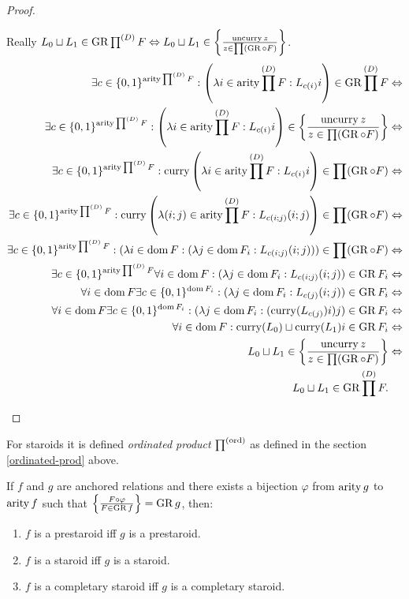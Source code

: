 \begin{proof}
\begin{widedisorder}
Really $L_{0}\sqcup L_{1}\in\operatorname{GR}\prod^{(D)}F\Leftrightarrow L_{0}\sqcup L_{1}\in\left\{ \frac{\operatorname{uncurry} z}{z\in\prod(\operatorname{GR}\circ F)}\right\}$.
\begin{align*}
\exists c\in\{0,1\}^{\operatorname{arity}\prod^{(D)}F}:\left(\lambda i\in\operatorname{arity}\prod^{(D)}F:L_{c(i_{})}i\right)\in\operatorname{GR}\prod^{(D)}F & \Leftrightarrow\\
\exists c\in\{0,1\}^{\operatorname{arity}\prod^{(D)}F}:\left(\lambda i\in\operatorname{arity}\prod^{(D)}F:L_{c(i_{})}i\right)\in\left\{ \frac{\operatorname{uncurry} z}{z\in\prod(\operatorname{GR}\circ F)}\right\} & \Leftrightarrow\\
\exists c\in\{0,1\}^{\operatorname{arity}\prod^{(D)}F}:\operatorname{curry}\left(\lambda i\in\operatorname{arity}\prod^{(D)}F:L_{c(i_{})}i\right)\in\prod(\operatorname{GR}\circ F) & \Leftrightarrow\\
\exists c\in\{0,1\}^{\operatorname{arity}\prod^{(D)}F}:\operatorname{curry}\left(\lambda(i;j)\in\operatorname{arity}\prod^{(D)}F:L_{c(i;j)}(i;j)\right)\in\prod(\operatorname{GR}\circ F) & \Leftrightarrow\\
\exists c\in\{0,1\}^{\operatorname{arity}\prod^{(D)}F}:(\lambda i\in\operatorname{dom} F:(\lambda j\in\operatorname{dom} F_{i}:L_{c(i;j)}(i;j)))\in\prod(\operatorname{GR}\circ F) & \Leftrightarrow\\
\exists c\in\{0,1\}^{\operatorname{arity}\prod^{(D)}F}\forall i\in\operatorname{dom} F:(\lambda j\in\operatorname{dom} F_{i}:L_{c(i;j)}(i;j))\in\operatorname{GR} F_{i} & \Leftrightarrow\\
\forall i\in\operatorname{dom} F\exists c\in\{0,1\}^{\operatorname{dom} F_{i}}:(\lambda j\in\operatorname{dom} F_{i}:L_{c(j)}(i;j))\in\operatorname{GR} F_{i} & \Leftrightarrow\\
\forall i\in\operatorname{dom} F\exists c\in\{0,1\}^{\operatorname{dom} F_{i}}:(\lambda j\in\operatorname{dom} F_{i}:(\operatorname{curry}(L_{c(j)})i)j)\in\operatorname{GR} F_{i} & \Leftrightarrow\\
\forall i\in\operatorname{dom} F:\operatorname{curry}(L_{0})\sqcup\operatorname{curry}(L_{1})i\in\operatorname{GR} F_{i} & \Leftrightarrow\\
L_{0}\sqcup L_{1}\in\left\{ \frac{\operatorname{uncurry} z}{z\in\prod(\operatorname{GR}\circ F)}\right\} & \Leftrightarrow\\
L_{0}\sqcup L_{1}\in\operatorname{GR}\prod^{(D)}F.
\end{align*}


\end{widedisorder}
\end{proof}
For staroids it is defined \emph{ordinated product} $\prod^{(\operatorname{ord})}$
as defined in the section \ref{ordinated-prod} above.
\begin{obvious}
If $f$ and $g$ are anchored relations and there exists a bijection
$\varphi$ from $\operatorname{arity} g$ to $\operatorname{arity} f$ such that $\left\{ \frac{F\circ\varphi}{F\in\operatorname{GR} f}\right\}=\operatorname{GR} g$,
then: 
\begin{enumerate}
\item $f$ is a prestaroid iff $g$ is a prestaroid.
\item $f$ is a staroid iff $g$ is a staroid.
\item $f$ is a completary staroid iff $g$ is a completary staroid.
\end{enumerate}
\end{obvious}
